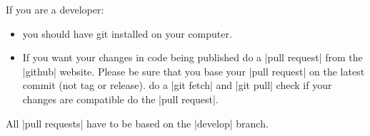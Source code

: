  If you are a developer:
\begin{itemize}
\item you should have git installed on your computer.
\item If you want your changes in code being published do a |pull request| from the |github| website. 
\subitem Please be sure that you base your 
|pull request| on the latest commit (not tag or release). 
\subitem do a |git fetch| and |git pull|
\subitem check if your changes are compatible
\subitem do the |pull request|.
\end{itemize}

 All |pull requests| have to be based on the |develop| branch.

